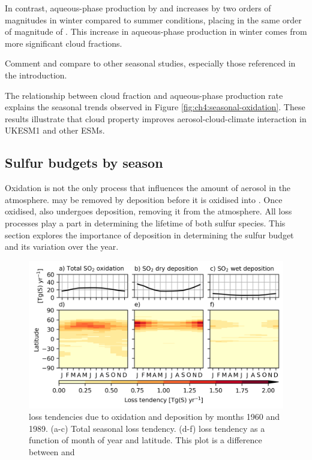 In contrast, aqueous-phase production by  and  increases by two orders of magnitudes in winter compared to summer conditions, placing  in the same order of magnitude of . This increase in aqueous-phase production in winter comes from more significant cloud fractions. 

Comment and compare to other seasonal studies, especially those referenced in the introduction.

The relationship between cloud fraction and aqueous-phase production rate explains the seasonal trends observed in Figure \ref{fig:ch4:seasonal-oxidation}. These results illustrate that cloud property improves aerosol-cloud-climate interaction in UKESM1 and other ESMs. 


\subsection{Sulfur budgets by season}

Oxidation is not the only process that influences the amount of aerosol in the atmosphere.  may be removed by deposition before it is oxidised into . Once oxidised,  also undergoes deposition, removing it from the atmosphere. All loss processes play a part in determining the lifetime of both sulfur species. This section explores the importance of deposition in determining the sulfur budget and its variation over the year.


\begin{figure}
    \centering
    \includegraphics{Chapter4/Figs/so2_losses_histsst_pothole.png}
    \caption[ loss tendencies due to oxidation and deposition by months between 1960 and 1989 due to aerosol precursor emissions]{ loss tendencies due to oxidation and deposition by months 1960 and 1989. (a-c) Total seasonal  loss tendency. (d-f)  loss tendency as a function of month of year and latitude. This plot is a difference between \histsst{} and \sstpiaer}
    \label{fig:ch4:so2-loss}
\end{figure}


